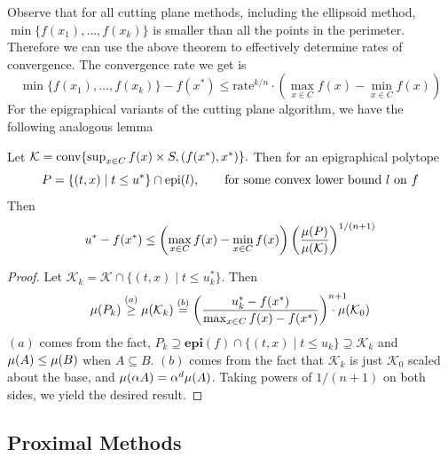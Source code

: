 Observe that for all cutting plane methods, including the ellipsoid method, $\min\{f(x_1),\dots, f(x_k)\}$ is smaller than all the points in the perimeter. Therefore we can use the above theorem to effectively determine rates of convergence. The convergence rate we get is
$$
\min\{f(x_{1}),\dots,f(x_{k})\}-f(x^{*})\leq \mbox{rate}^{k/n}\cdot\left(\max_{x\in C}f(x)-\min_{x\in C}f(x)\right)
$$
For the epigraphical variants of the cutting plane algorithm, we have the following analogous lemma

\begin{lem} \label{lem:non_strongly_convex_convergencegen}
Let  $\mathcal{K}=\mbox{{\rm conv}}\{\sup_{x\in C} f(x) \times  S,(f(x^*),x^*)\}.$
Then for an epigraphical polytope $$P =\{(t,x)\mid t\leq u^*\}\cap \mbox{\normalfont epi}(l), \qquad \mbox{for some convex lower bound $l$ on $f$}
$$
Then \[
u^*-f(x^*)\leq \left(\max_{x\in C}f(x)-\min_{x\in C}f(x) \right) \left( \frac{\mu(P)}{\mu(\mathcal{K})} \right)^{1/(n+1)}
\]
\end{lem}

\begin{proof}
Let $\mathcal{K}_k =\mathcal{K}\cap\{(t,x)\mid t \leq u^*_k\}$. Then 
\[
  \volmu(P_k)\overset{(a)}{\geq}\volmu(\mathcal{K}_k)\overset{(b)}{=}
  \left(\frac{u^*_k-f(x^*)}{\max_{x\in C} f(x) -f(x^*)}\right)^{n+1} \!\!\!\!\!\!\!\!\!\cdot \volmu(\mathcal{K}_0)
\]
$(a)$ comes from the fact, $P_k\supseteq \mathbf{epi}(f) \cap \{(t,x) \mid t \leq u_k\} \supseteq \mathcal{K}_k$ and
$\mu(A)\leq\mu(B)$ when $A\subseteq B$. $(b)$ comes from the fact
that $\mathcal{K}_k$ is just $\mathcal{K}_0$ scaled about the
base, and $\mu(\alpha A)=\alpha^{d}\mu(A)$.
Taking powers of $1/(n+1)$ on both sides, we yield the desired result.
\end{proof}

\subsection{Proximal Methods}

